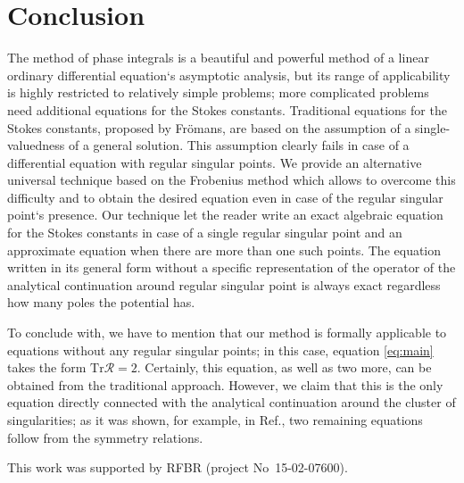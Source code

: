 \documentclass[aip,jmp,reprint]{revtex4-1}
\def\R{\bm{\mathcal{R}}}
\def\Tr{\mathrm{Tr}}
\begin{document}
\section{Conclusion \label{sec:con}}
The method of phase integrals is a beautiful and powerful method of a linear ordinary 
differential equation`s asymptotic analysis, but its range of applicability is highly 
restricted to relatively simple problems; more complicated problems need additional equations 
for the Stokes constants. Traditional equations for the Stokes constants, proposed by Fr\"omans\cite{frpaper},
are based on the assumption of a single-valuedness of a general solution. This assumption clearly fails
in case of a differential equation with regular singular points. We provide an alternative universal
technique based on the Frobenius method which allows to overcome this difficulty and to obtain the 
desired equation even in case of the regular singular point`s presence. 
Our technique let the reader write an exact algebraic equation for the Stokes constants in case
of a single regular singular point and an approximate equation when there are more than one such points.
The equation written in its general form without a specific representation of the operator of the analytical
continuation around regular singular point is always exact regardless how many poles the potential has. 

To conclude with, we have to mention that our method is formally applicable to equations without any regular
singular points; in this case, equation \eqref{eq:main} takes the form $\Tr \R = 2$. Certainly, this equation,
as well as two more, can be obtained from the traditional approach. However, we claim that this is the only equation
directly connected with the analytical continuation around the cluster of singularities; as it was shown,
for example, in Ref., two remaining equations follow from the symmetry relations.

\begin{acknowledgments}
This work was supported by RFBR (project No~15-02-07600).
\end{acknowledgments}
\end{document}
